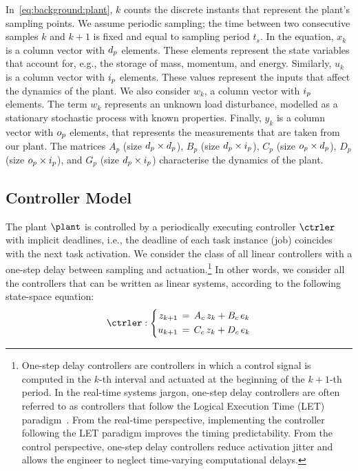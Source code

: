 In~\eqref{eq:background:plant}, $k$ counts the discrete instants that represent the plant's sampling points.
We assume periodic sampling; the time between two consecutive samples $k$ and $k+1$ is fixed and equal to sampling period $t_s$.
In the equation, $x_k$ is a column vector with $d_p$ elements.
These elements represent the state variables that account for, e.g., the storage of mass, momentum, and energy.
Similarly, $u_k$ is a column vector with $i_p$ elements.
These values represent the inputs that affect the dynamics of the plant.
We also consider $w_k$, a column vector with $i_p$ elements.
The term $w_k$ represents an unknown load disturbance, modelled as a stationary stochastic process with known properties.
Finally, $y_k$ is a column vector with $o_p$ elements, that represents the measurements that are taken from our plant.
The matrices $A_p$ (size $d_p \times d_p$), $B_p$ (size $d_p \times i_p$), $C_p$ (size $o_p \times d_p$), $D_p$ (size $o_p \times i_p$), and $G_p$ (size $d_p \times i_p$) characterise the dynamics of the plant.

\subsection{Controller Model}

The plant $\plant$ is controlled by a periodically executing controller $\ctrler$ with implicit deadlines, i.e., the deadline of each task instance (job) coincides with the next task activation.
We consider the class of all linear controllers with a one-step delay between sampling and actuation.\footnote{One-step delay controllers are controllers in which a control signal is computed in the $k$-th interval and actuated at the beginning of the $k+1$-th period. In the real-time systems jargon, one-step delay controllers are often referred to as controllers that follow the Logical Execution Time (LET) paradigm~\cite{Kirsch:2012, Ernst:2018}. From the real-time perspective, implementing the controller following the LET paradigm improves the timing predictability. From the control perspective, one-step delay controllers reduce activation jitter and allows the engineer to neglect time-varying computational delays.}
In other words, we consider all the controllers that can be written as linear systems, according to the following state-space equation:
\begin{equation}
\label{eq:background:controller}
    \ctrler : \left\{
    \begin{aligned}
        z_{k+1} &\,=\, A_c\,z_k + B_c\,e_k \\
        u_{k+1} &\,=\, C_c\,z_k + D_c\,e_k
    \end{aligned}
    \right.
\end{equation}

